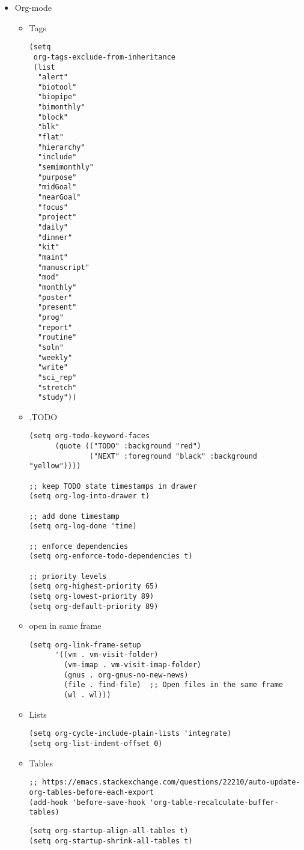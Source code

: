 \documentclass{article}
\begin{document}
\begin{itemize}
\begin{itemize}
\begin{verbatim}
\end{verbatim}

\item Org-mode
\label{sec:org57a025f}
\begin{itemize}
\item Tags
\label{sec:org63a0ad6}
\begin{verbatim}
(setq
 org-tags-exclude-from-inheritance
 (list
  "alert"
  "biotool"
  "biopipe"
  "bimonthly"
  "block"
  "blk"
  "flat"
  "hierarchy"
  "include"
  "semimonthly"
  "purpose"
  "midGoal"
  "nearGoal"
  "focus"
  "project"
  "daily"
  "dinner"
  "kit"
  "maint"
  "manuscript"
  "mod"
  "monthly"
  "poster"
  "present"
  "prog"
  "report"
  "routine"
  "soln"
  "weekly"
  "write"
  "sci_rep"
  "stretch"
  "study"))
\end{verbatim}
\item .TODO
\label{sec:org00bd31a}
\begin{verbatim}
(setq org-todo-keyword-faces
      (quote (("TODO" :background "red")
              ("NEXT" :foreground "black" :background "yellow"))))

;; keep TODO state timestamps in drawer
(setq org-log-into-drawer t)

;; add done timestamp
(setq org-log-done 'time)

;; enforce dependencies
(setq org-enforce-todo-dependencies t)

;; priority levels
(setq org-highest-priority 65)
(setq org-lowest-priority 89)
(setq org-default-priority 89)

\end{verbatim}
\item open in same frame
\label{sec:org27b8914}
\begin{verbatim}
(setq org-link-frame-setup
      '((vm . vm-visit-folder)
        (vm-imap . vm-visit-imap-folder)
        (gnus . org-gnus-no-new-news)
        (file . find-file)  ;; Open files in the same frame
        (wl . wl)))

\end{verbatim}

\item Lists
\label{sec:org3864bd4}
\begin{verbatim}
(setq org-cycle-include-plain-lists 'integrate)
(setq org-list-indent-offset 0)
\end{verbatim}

\item Tables
\label{sec:org63e6958}
\begin{verbatim}
;; https://emacs.stackexchange.com/questions/22210/auto-update-org-tables-before-each-export
(add-hook 'before-save-hook 'org-table-recalculate-buffer-tables)
\end{verbatim}
\begin{verbatim}
(setq org-startup-align-all-tables t)
(setq org-startup-shrink-all-tables t)
\end{verbatim}


\end{itemize}
\end{itemize}
\end{itemize}
\end{document}
